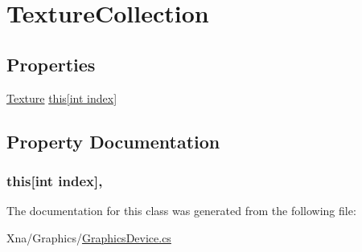 \hypertarget{classMicrosoft_1_1Xna_1_1Framework_1_1Graphics_1_1TextureCollection}{}\section{Texture\+Collection}
\label{classMicrosoft_1_1Xna_1_1Framework_1_1Graphics_1_1TextureCollection}
\subsection*{Properties}
\begin{DoxyCompactItemize}
\item 
\hyperlink{classMicrosoft_1_1Xna_1_1Framework_1_1Graphics_1_1Texture}{Texture} \hyperlink{classMicrosoft_1_1Xna_1_1Framework_1_1Graphics_1_1TextureCollection_aeb9c9d1cbe3af32ff7a111dc29892e3b}{this\mbox{[}int index\mbox{]}}
\end{DoxyCompactItemize}


\subsection{Property Documentation}
\hypertarget{classMicrosoft_1_1Xna_1_1Framework_1_1Graphics_1_1TextureCollection_aeb9c9d1cbe3af32ff7a111dc29892e3b}{}
\subsubsection[{this[int index]}]{ this\mbox{[}int index\mbox{]}\hspace{0.3cm}{\ttfamily [get]}, {\ttfamily [set]}}\label{classMicrosoft_1_1Xna_1_1Framework_1_1Graphics_1_1TextureCollection_aeb9c9d1cbe3af32ff7a111dc29892e3b}


The documentation for this class was generated from the following file\+:\begin{DoxyCompactItemize}
\item 
Xna/\+Graphics/\hyperlink{GraphicsDevice_8cs}{Graphics\+Device.\+cs}\end{DoxyCompactItemize}
